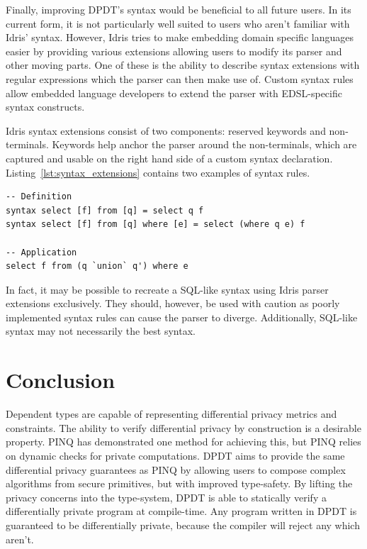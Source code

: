 \documentclass[12pt]{report}
\begin{document}

Finally, improving DPDT's syntax would be beneficial to all future users.
In its current form, it is not particularly well suited to users who aren't familiar with Idris' syntax.
However, Idris tries to make embedding domain specific languages easier by providing various extensions allowing users to modify its parser and other moving parts.
One of these is the ability to describe syntax extensions with regular expressions which the parser can then make use of.
Custom syntax rules allow embedded language developers to extend the parser with EDSL-specific syntax constructs.

Idris syntax extensions consist of two components: reserved keywords and non-terminals.
Keywords help anchor the parser around the non-terminals, which are captured and usable on the right hand side of a custom syntax declaration.
Listing~\ref{lst:syntax_extensions} contains two examples of syntax rules.

\begin{lstlisting}[caption={Extending Idris' syntax},label={lst:syntax_extensions}]
-- Definition
syntax select [f] from [q] = select q f
syntax select [f] from [q] where [e] = select (where q e) f

-- Application
select f from (q `union` q') where e
\end{lstlisting}

In fact, it may be possible to recreate a SQL-like syntax using Idris parser extensions exclusively.
They should, however, be used with caution as poorly implemented syntax rules can cause the parser to diverge.
Additionally, SQL-like syntax may not necessarily the best syntax.

\chapter{Conclusion}\label{sec:conclusion}

Dependent types are capable of representing differential privacy metrics and constraints.
The ability to verify differential privacy by construction is a desirable property.
PINQ has demonstrated one method for achieving this, but PINQ relies on dynamic checks for private computations.
DPDT aims to provide the same differential privacy guarantees as PINQ by allowing users to compose complex algorithms from secure primitives, but with improved type-safety.
By lifting the privacy concerns into the type-system, DPDT is able to statically verify a differentially private program at compile-time.
Any program written in DPDT is guaranteed to be differentially private, because the compiler will reject any which aren't.
\end{document}
